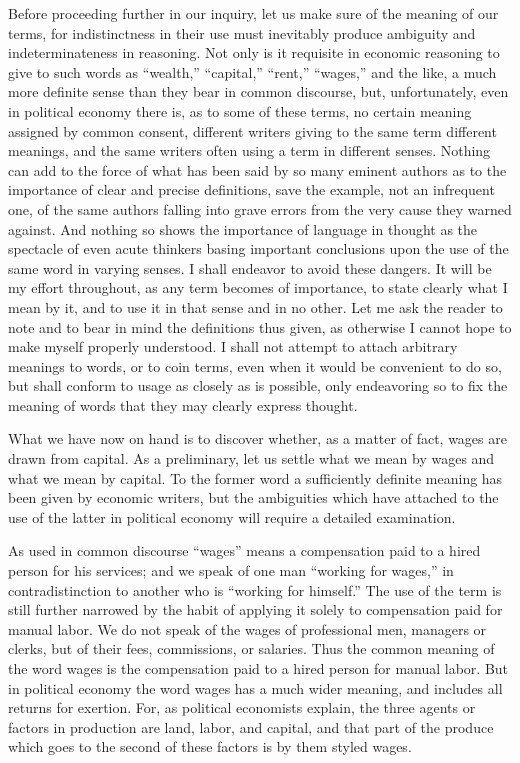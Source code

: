 Before proceeding further in our inquiry, let us make sure of the
meaning of our terms, for indistinctness in their use must inevitably
produce ambiguity and indeterminateness in reasoning. Not only is it
requisite in economic reasoning to give to such words as ``wealth,''
``capital,'' ``rent,'' ``wages,'' and the like, a much more definite
sense than they bear in common discourse, but, unfortunately, even in
political economy there is, as to some of these terms, no certain
meaning assigned by common consent, different writers giving to the same
term different meanings, and the same writers often using a term in
different senses. Nothing can add to the force of what has been said by
so many eminent authors as to the importance of clear and precise
definitions, save the example, not an infrequent one, of the same
authors falling into grave errors from the very cause they warned
against. And nothing so shows the importance of language in thought as
the spectacle of even acute thinkers basing important conclusions upon
the use of the same word in varying senses. I shall endeavor to avoid
these dangers. It will be my effort throughout, as any term becomes of
importance, to state clearly what I mean by it, and to use it in that
sense and in no other. Let me ask the reader to note and to bear in mind
the definitions thus given, as otherwise I cannot hope to make myself
properly understood. I shall not attempt to attach arbitrary meanings to
words, or to coin terms, even when it would be convenient to do so, but
shall conform to usage as closely as is possible, only endeavoring so to
fix the meaning of words that they may clearly express thought.

What we have now on hand is to discover whether, as a matter of fact,
wages are drawn from capital. As a preliminary, let us settle what we
mean by wages and what we mean by capital. To the former word a
sufficiently definite meaning has been given by economic writers, but
the ambiguities which have attached to the use of the latter in
political economy will require a detailed examination.

As used in common discourse ``wages'' means a compensation paid to a
hired person for his services; and we speak of one man ``working for
wages,'' in contradistinction to another who is ``working for himself.''
The use of the term is still further narrowed by the habit of applying
it solely to compensation paid for manual labor. We do not speak of the
wages of professional men, managers or clerks, but of their fees,
commissions, or salaries. Thus the common meaning of the word wages is
the compensation paid to a hired person for manual labor. But in
political economy the word wages has a much wider meaning, and includes
all returns for exertion. For, as political economists explain, the
three agents or factors in production are land, labor, and capital, and
that part of the produce which goes to the second of these factors is by
them styled wages.

